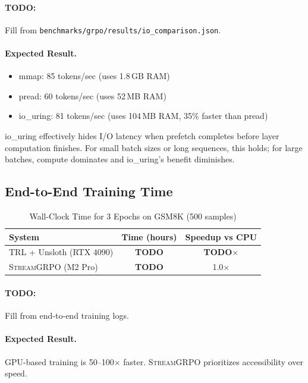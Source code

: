 \documentclass[sigconf,review,anonymous]{acmart}
\begin{document}
\paragraph{TODO:} Fill from \texttt{benchmarks/grpo/results/io\_comparison.json}.

\paragraph{Expected Result.}
\begin{itemize}
\item mmap: 85 tokens/sec (uses 1.8\,GB RAM)
\item pread: 60 tokens/sec (uses 52\,MB RAM)
\item io\_uring: 81 tokens/sec (uses 104\,MB RAM, 35\% faster than pread)
\end{itemize}

io\_uring effectively hides I/O latency when prefetch completes before layer computation finishes. For small batch sizes or long sequences, this holds; for large batches, compute dominates and io\_uring's benefit diminishes.

\subsection{End-to-End Training Time}

\begin{table}[h]
\centering
\caption{Wall-Clock Time for 3 Epochs on GSM8K (500 samples)}
\label{tab:time}
\begin{tabular}{lcc}
\toprule
\textbf{System} & \textbf{Time (hours)} & \textbf{Speedup vs CPU} \\
\midrule
TRL + Unsloth (RTX 4090) & \textbf{TODO} & \textbf{TODO}$\times$ \\
\textsc{StreamGRPO} (M2 Pro) & \textbf{TODO} & 1.0$\times$ \\
\bottomrule
\end{tabular}
\end{table}

\paragraph{TODO:} Fill from end-to-end training logs.

\paragraph{Expected Result.} GPU-based training is 50--100$\times$ faster. \textsc{StreamGRPO} prioritizes accessibility over speed.
\end{document}
